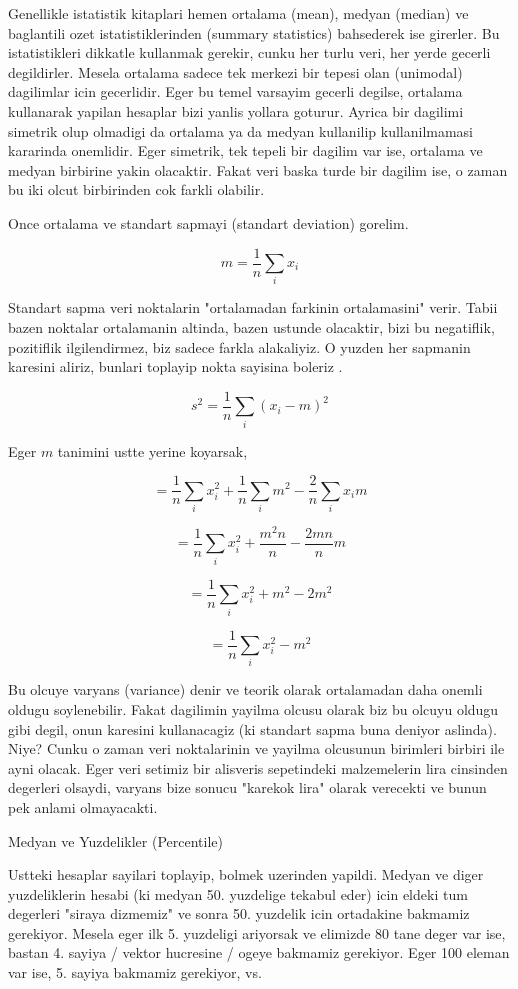 \documentclass[12pt,fleqn]{article}\usepackage{../common}
\begin{document}
Genellikle istatistik kitaplari hemen ortalama (mean), medyan (median) ve
baglantili ozet istatistiklerinden (summary statistics) bahsederek ise
girerler. Bu istatistikleri dikkatle kullanmak gerekir, cunku her turlu
veri, her yerde gecerli degildirler. Mesela ortalama sadece tek merkezi bir
tepesi olan (unimodal) dagilimlar icin gecerlidir. Eger bu temel varsayim
gecerli degilse, ortalama kullanarak yapilan hesaplar bizi yanlis yollara
goturur. Ayrica bir dagilimi simetrik olup olmadigi da ortalama ya da
medyan kullanilip kullanilmamasi kararinda onemlidir. Eger simetrik, tek
tepeli bir dagilim var ise, ortalama ve medyan birbirine yakin
olacaktir. Fakat veri baska turde bir dagilim ise, o zaman bu iki olcut
birbirinden cok farkli olabilir.

Once ortalama ve standart sapmayi (standart deviation) gorelim.

$$ m  = \frac{ 1}{n}\sum_i x_i $$

Standart sapma veri noktalarin "ortalamadan farkinin ortalamasini"
verir. Tabii bazen noktalar ortalamanin altinda, bazen ustunde olacaktir,
bizi bu negatiflik, pozitiflik ilgilendirmez, biz sadece farkla
alakaliyiz. O yuzden her sapmanin karesini aliriz, bunlari toplayip nokta
sayisina boleriz .

$$ s^2 = \frac{ 1}{n} \sum_i (x_i - m)^2 $$

Eger $m$ tanimini ustte yerine koyarsak, 

$$ = \frac{ 1}{n} \sum_i x_i^2 + \frac{ 1}{n} \sum_i m^2 - \frac{ 2}{n} \sum_i x_im  $$

$$ = \frac{ 1}{n} \sum_i x_i^2 + \frac{ m^2n}{n} - \frac{ 2mn}{n}m $$

$$ = \frac{ 1}{n} \sum_i x_i^2 +  m^2 - 2m^2 $$

$$ = \frac{ 1}{n} \sum_i x_i^2 - m^2 $$

Bu olcuye varyans (variance) denir ve teorik olarak ortalamadan daha onemli
oldugu soylenebilir. Fakat dagilimin yayilma olcusu olarak biz bu olcuyu
oldugu gibi degil, onun karesini kullanacagiz (ki standart sapma buna
deniyor aslinda). Niye? Cunku o zaman veri noktalarinin ve yayilma olcusunun
birimleri birbiri ile ayni olacak. Eger veri setimiz bir alisveris
sepetindeki malzemelerin lira cinsinden degerleri olsaydi, varyans bize
sonucu "karekok lira" olarak verecekti ve bunun pek anlami olmayacakti. 

Medyan ve Yuzdelikler (Percentile)

Ustteki hesaplar sayilari toplayip, bolmek uzerinden yapildi. Medyan
ve diger yuzdeliklerin hesabi (ki medyan 50. yuzdelige tekabul eder)
icin eldeki tum degerleri "siraya dizmemiz" ve sonra 50. yuzdelik icin
ortadakine bakmamiz gerekiyor. Mesela eger ilk 5. yuzdeligi ariyorsak
ve elimizde 80 tane deger var ise, bastan 4. sayiya / vektor hucresine
/ ogeye bakmamiz gerekiyor. Eger 100 eleman var ise, 5. sayiya
bakmamiz gerekiyor, vs.
\end{document}
